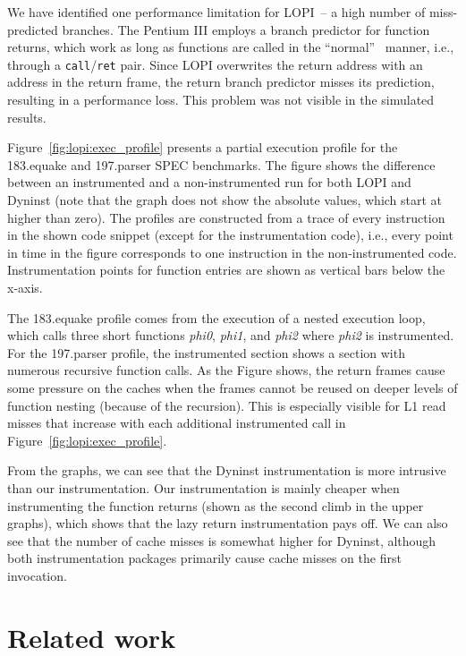 We have identified one performance limitation for LOPI~-- a high number of
miss-predicted branches. The Pentium III employs a branch predictor for
function returns, which work as long as functions are called in the ``normal''~
manner, i.e., through a \texttt{call}/\texttt{ret} pair. Since LOPI overwrites
the return address with an address in the return frame, the return branch
predictor misses its prediction, resulting in a performance loss. This problem
was not visible in the simulated results.

Figure~\ref{fig:lopi:exec_profile} presents a partial execution profile for the
183.equake and 197.parser SPEC benchmarks.  The figure shows the difference
between an instrumented and a non-instrumented run for both LOPI and Dyninst
(note that the graph does not show the absolute values, which start at higher
than zero).  The profiles are constructed from a trace of every instruction in
the shown code snippet (except for the instrumentation code), i.e., every
point in time in the figure corresponds to one instruction in the
non-instrumented code.  Instrumentation points for function entries are shown
as vertical bars below the x-axis.

The 183.equake profile comes from the execution of a nested execution loop,
which calls three short functions \emph{phi0}, \emph{phi1}, and \emph{phi2}
where \emph{phi2} is instrumented. For the 197.parser profile, the
instrumented section shows a section with numerous recursive function calls.
As the Figure shows, the return frames cause some pressure on the caches when
the frames cannot be reused on deeper levels of function nesting (because of
the recursion). This is especially visible for L1 read misses that increase
with each additional instrumented call in Figure~\ref{fig:lopi:exec_profile}.

From the graphs, we can see that the Dyninst instrumentation is more intrusive
than our instrumentation. Our instrumentation is mainly cheaper when
instrumenting the function returns (shown as the second climb in the upper
graphs), which shows that the lazy return instrumentation pays off. We can also
see that the number of cache misses is somewhat higher for Dyninst, although
both instrumentation packages primarily cause cache misses on the first
invocation.


\section{Related work}

